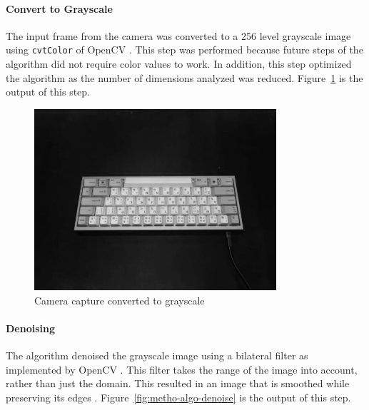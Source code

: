 \documentclass{report}
\begin{document}
\newpage

\paragraph{Convert to Grayscale}
The input frame from the camera was converted to a 256 level grayscale image
using \texttt{cvtColor} of OpenCV \parencite{opencv-cvtColor}. This step was
performed because future steps of the algorithm did not require color values to
work. In addition, this step optimized the algorithm as the number of dimensions
analyzed was reduced. Figure~\ref{fig:metho-algo-convert} is the output of this
step.

\begin{figure}[H]
	\centering
	\includegraphics[width=0.8\textwidth]{grayscale.png}
	\caption{Camera capture converted to grayscale}
	\label{fig:metho-algo-convert}
	\centering
\end{figure}

\paragraph{Denoising}
The algorithm denoised the grayscale image using a bilateral filter as
implemented by OpenCV \parencite{opencv-bilateral-filter}. This filter takes the
range of the image into account, rather than just the domain. This resulted in
an image that is smoothed while preserving its edges
\parencite{bilateral-filter}. Figure~\ref{fig:metho-algo-denoise} is the output
of this step.
\end{document}
